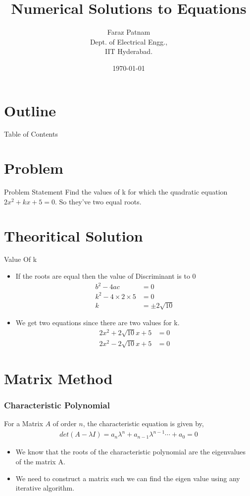 \documentclass{beamer}
\title{Numerical Solutions to Equations}
\author{Faraz Patnam\\ Dept. of Electrical Engg.,\\IIT Hyderabad.}
\date{\today}
\providecommand{\brak}[1]{\ensuremath{\left(#1\right)}}
\theoremstyle{remark}
\numberwithin{equation}{section}
\begin{document}
\begin{frame}
\titlepage
\end{frame}

\section*{Outline}
\begin{frame}{Table of Contents}
    \tableofcontents
\end{frame}

\section{Problem}
\begin{frame}{Problem Statement}
    Find the values of k for which the quadratic equation $2x^2 + kx + 5 = 0$. So they've two equal roots.
\end{frame}

\section{Theoritical Solution}
\begin{frame}{Value Of k}
    \begin{itemize}
    \item If the roots are equal then the value of Discriminant is to $0$
        \begin{align}
            b^2 - 4ac &= 0\\
            k^2 - 4 \times 2 \times 5 &= 0\\
            k &= \pm 2\sqrt{10}
        \end{align}
    \item We get two equations since there are two values for k.
        \begin{align}
            2x^2 + 2\sqrt{10}x + 5 &= 0 \label{Quad1}\\
            2x^2 - 2\sqrt{10}x + 5 &= 0 \label{Quad2}
        \end{align}
\end{itemize}
\end{frame}
\section{Matrix Method}
\begin{frame}
  \frametitle{Characteristic Polynomial}
  For a Matrix $A$ of order $n$, the characteristic equation is given by,
\begin{align}
  det\brak{A - \lambda I} = a_n \lambda ^n + a_{n-1} \lambda ^{n-1} \cdots + a_0 = 0
 \end{align}
 \begin{itemize}
     \item We know that the roots of the characteristic polynomial are the eigenvalues of the matrix A. 
     \item We need to construct a matrix such we can find the eigen value using any iterative algorithm.
 \end{itemize}
\end{frame}
\end{document}
